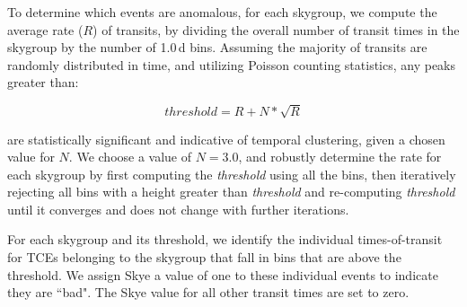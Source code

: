 To determine which events are anomalous, for each skygroup, we compute the average rate ($R$) of transits, by dividing the overall number of transit times in the skygroup by the number of 1.0\,d bins. Assuming the majority of transits are randomly distributed in time, and utilizing Poisson counting statistics, any peaks greater than:

\begin{equation}
\label{eq:skye}
threshold = R + N*\sqrt{R}
\end{equation}

\noindent are statistically significant and indicative of temporal clustering, given a chosen value for $N$. We choose a value of $N = 3.0$, and robustly determine the rate for each skygroup by first computing the \emph{threshold} using all the bins, then iteratively rejecting all bins with a height greater than \emph{threshold} and re-computing \emph{threshold} until it converges and does not change with further iterations.

For each skygroup and its threshold, we identify the individual times-of-transit for TCEs belonging to the skygroup that fall in bins that are above the threshold. We assign Skye a value of one to these individual events to indicate they are ``bad". The Skye value for all other transit times are set to zero.

